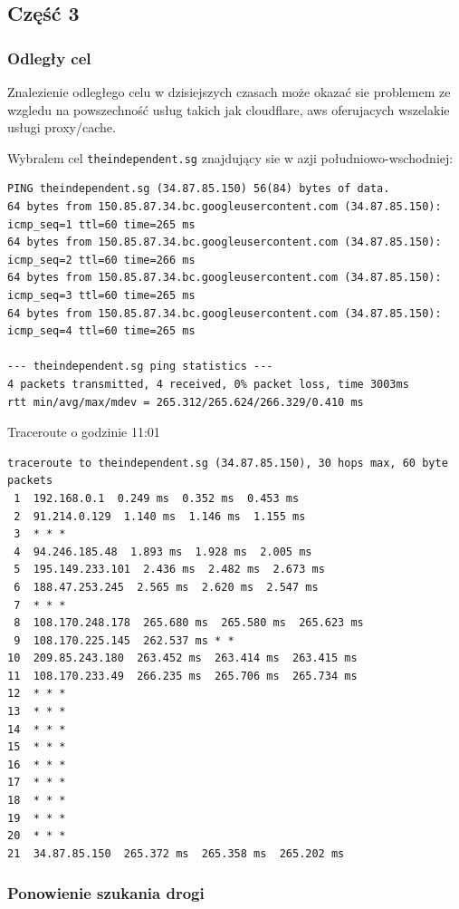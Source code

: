 \documentclass[11pt]{article}
\begin{document}
\subsection{Część 3}
\label{sec:orgfbecfdd}
\subsubsection{Odległy cel}
\label{sec:org7a9e4e6}
Znalezienie odległego celu w dzisiejszych czasach może okazać sie problemem ze wzgledu na powszechność usług takich jak cloudflare, aws oferujacych wszelakie usługi proxy/cache.

Wybralem cel \texttt{theindependent.sg} znajdujący sie w azji południowo-wschodniej:
\begin{verbatim}
PING theindependent.sg (34.87.85.150) 56(84) bytes of data.
64 bytes from 150.85.87.34.bc.googleusercontent.com (34.87.85.150): icmp_seq=1 ttl=60 time=265 ms
64 bytes from 150.85.87.34.bc.googleusercontent.com (34.87.85.150): icmp_seq=2 ttl=60 time=266 ms
64 bytes from 150.85.87.34.bc.googleusercontent.com (34.87.85.150): icmp_seq=3 ttl=60 time=265 ms
64 bytes from 150.85.87.34.bc.googleusercontent.com (34.87.85.150): icmp_seq=4 ttl=60 time=265 ms

--- theindependent.sg ping statistics ---
4 packets transmitted, 4 received, 0% packet loss, time 3003ms
rtt min/avg/max/mdev = 265.312/265.624/266.329/0.410 ms
\end{verbatim}

Traceroute o godzinie 11:01
\begin{verbatim}
traceroute to theindependent.sg (34.87.85.150), 30 hops max, 60 byte packets
 1  192.168.0.1  0.249 ms  0.352 ms  0.453 ms
 2  91.214.0.129  1.140 ms  1.146 ms  1.155 ms
 3  * * *
 4  94.246.185.48  1.893 ms  1.928 ms  2.005 ms
 5  195.149.233.101  2.436 ms  2.482 ms  2.673 ms
 6  188.47.253.245  2.565 ms  2.620 ms  2.547 ms
 7  * * *
 8  108.170.248.178  265.680 ms  265.580 ms  265.623 ms
 9  108.170.225.145  262.537 ms * *
10  209.85.243.180  263.452 ms  263.414 ms  263.415 ms
11  108.170.233.49  266.235 ms  265.706 ms  265.734 ms
12  * * *
13  * * *
14  * * *
15  * * *
16  * * *
17  * * *
18  * * *
19  * * *
20  * * *
21  34.87.85.150  265.372 ms  265.358 ms  265.202 ms
\end{verbatim}

\subsubsection{Ponowienie szukania drogi}
\label{sec:orgd4374dc}
\end{document}
